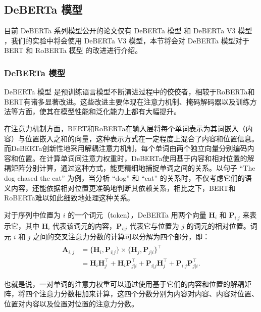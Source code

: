 \subsection{DeBERTa 模型}
\label{sec:method-pretrain-deberta}

目前 DeBERTa 系列模型公开的论文仅有 DeBERTa 模型 \cite{he_deberta_2021} 和 DeBERTa V3 模型 \cite{he2023debertav3improvingdebertausing}，我们的实验中将会使用 DeBERTa V3 模型，本节将会对 DeBERTa 模型对于 BERT \cite{devlin_bert_2019} 和 RoBERTa 模型 \cite{liu_roberta_2019} 的改进进行介绍。

\subsubsection{DeBERTa 模型}

DeBERTa 模型 \cite{he_deberta_2021} 是预训练语言模型不断演进过程中的佼佼者，相较于RoBERTa和BERT有诸多显著改进。这些改进主要体现在注意力机制、掩码解码器以及训练方法等方面，使其在模型性能和泛化能力上都有大幅提升。

在注意力机制方面，BERT和RoBERTa在输入层将每个单词表示为其词嵌入（内容）与位置嵌入之和的向量，这种表示方式在一定程度上混合了内容和位置信息。而DeBERTa创新性地采用解耦注意力机制，每个单词由两个独立向量分别编码内容和位置。在计算单词间注意力权重时，DeBERTa使用基于内容和相对位置的解耦矩阵分别计算，通过这种方式，能更精细地捕捉单词之间的关系。以句子 “The dog chased the cat” 为例，当分析 “dog” 和 “cat” 的关系时，不仅考虑它们的语义内容，还能依据相对位置更准确地判断其依赖关系，相比之下，BERT和RoBERTa难以如此细致地处理这种关系。

对于序列中位置为 $i$ 的一个词元（token），DeBERTa 用两个向量 $\mathbf{H}_{i}$ 和 $\mathbf{P}_{i|j}$ 来表示它，其中 $\mathbf{H}_{i}$ 代表该词元的内容，$\mathbf{P}_{i|j}$  代表它与位置为 $j$ 的词元的相对位置。词元 $i$ 和 $j$ 之间的交叉注意力分数的计算可以分解为四个部分，即：
\begin{align}
\label{eq:deberta-attention}
\begin{split}
\mathbf{A}_{i, j} & = \{\mathbf{H}_{i}, \mathbf{P}_{i | j}\} \times \{\mathbf{H}_{j}, \mathbf{P}_{j | i}\}^{\intercal} \\
& = \mathbf{H}_{i}\mathbf{H}_{j}^{\intercal}+\mathbf{H}_{i}\mathbf{P}_{j | i}^{\intercal}+\mathbf{P}_{i | j}\mathbf{H}_{j}^{\intercal}+\mathbf{P}_{i | j}\mathbf{P}_{j | i}^{\intercal}.
\end{split}
\end{align}

也就是说，一对单词的注意力权重可以通过使用基于它们的内容和位置的解耦矩阵，将四个注意力分数相加来计算，这四个分数分别为内容对内容、内容对位置、位置对内容以及位置对位置的注意力分数。

